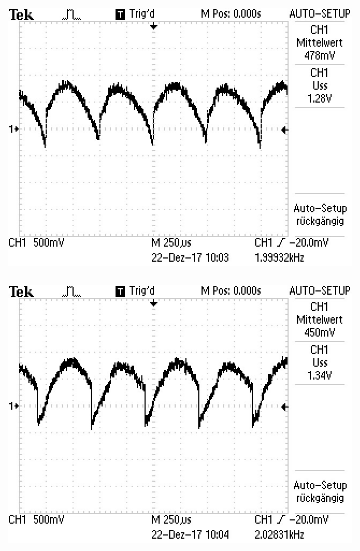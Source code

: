 \begin{figure}[H]
  \centering
  \begin{subfigure}{0.48\textwidth}
	\includegraphics[width=\textwidth]{0GradR.JPG}
\end{subfigure}
\begin{subfigure}{0.48\textwidth}
  \includegraphics[width=\textwidth]{45GradR.JPG}
\end{subfigure}
\begin{subfigure}{0.48\textwidth}

\end{subfigure}
\end{figure}
